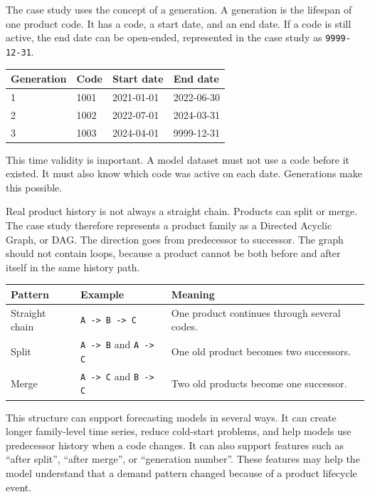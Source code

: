 \documentclass[12pt]{article}
\begin{document}
The case study uses the concept of a generation. A generation is the lifespan of one product code. It has a code, a start date, and an end date. If a code is still active, the end date can be open-ended, represented in the case study as \texttt{9999-12-31}.

\begin{longtable}{|p{}|p{}|p{}|p{}|}
\hline
\textbf{Generation} & \textbf{Code} & \textbf{Start date} & \textbf{End date} \\
\hline
1 & 1001 & 2021-01-01 & 2022-06-30 \\
\hline
2 & 1002 & 2022-07-01 & 2024-03-31 \\
\hline
3 & 1003 & 2024-04-01 & 9999-12-31 \\
\hline
\end{longtable}

This time validity is important. A model dataset must not use a code before it existed. It must also know which code was active on each date. Generations make this possible.

Real product history is not always a straight chain. Products can split or merge. The case study therefore represents a product family as a Directed Acyclic Graph, or DAG. The direction goes from predecessor to successor. The graph should not contain loops, because a product cannot be both before and after itself in the same history path.

\begin{longtable}{|p{}|p{}|p{}|}
\hline
\textbf{Pattern} & \textbf{Example} & \textbf{Meaning} \\
\hline
Straight chain & \texttt{A -> B -> C} & One product continues through several codes. \\
\hline
Split & \texttt{A -> B} and \texttt{A -> C} & One old product becomes two successors. \\
\hline
Merge & \texttt{A -> C} and \texttt{B -> C} & Two old products become one successor. \\
\hline
\end{longtable}

This structure can support forecasting models in several ways. It can create longer family-level time series, reduce cold-start problems, and help models use predecessor history when a code changes. It can also support features such as ``after split'', ``after merge'', or ``generation number''. These features may help the model understand that a demand pattern changed because of a product lifecycle event.
\end{document}
